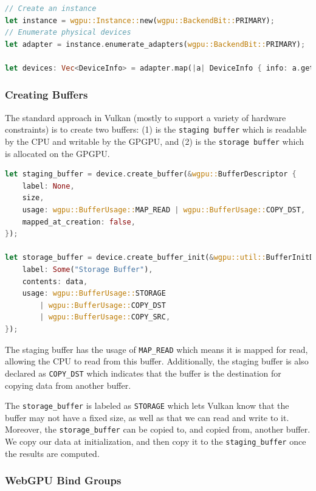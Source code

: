\documentclass{article}
\begin{document}
\begin{lstlisting}[language=Rust, style=boxed]
// Create an instance
let instance = wgpu::Instance::new(wgpu::BackendBit::PRIMARY);
// Enumerate physical devices
let adapter = instance.enumerate_adapters(wgpu::BackendBit::PRIMARY);

let devices: Vec<DeviceInfo> = adapter.map(|a| DeviceInfo { info: a.get_info() }).collect();
\end{lstlisting}

\subsubsection{Creating Buffers}

The standard approach in Vulkan (mostly to support a variety of hardware constraints) is to create two buffers: (1) is the \texttt{staging buffer} which is readable by the CPU and writable by the GPGPU, and (2) is the \texttt{storage buffer} which is allocated on the GPGPU. 

\begin{lstlisting}[language=Rust, style=boxed]
let staging_buffer = device.create_buffer(&wgpu::BufferDescriptor {
    label: None,
    size,
    usage: wgpu::BufferUsage::MAP_READ | wgpu::BufferUsage::COPY_DST,
    mapped_at_creation: false,
});

let storage_buffer = device.create_buffer_init(&wgpu::util::BufferInitDescriptor {
    label: Some("Storage Buffer"),
    contents: data,
    usage: wgpu::BufferUsage::STORAGE
        | wgpu::BufferUsage::COPY_DST
        | wgpu::BufferUsage::COPY_SRC,
});
\end{lstlisting}

The staging buffer has the usage of \texttt{MAP\_READ} which means it is mapped for read, allowing the CPU to read from this buffer. Additionally, the staging buffer is also declared as \texttt{COPY\_DST}  which indicates that the buffer is the destination for copying data from another buffer.

The \texttt{storage\_buffer} is labeled as \texttt{STORAGE} which lets Vulkan know that the buffer may not have a fixed size, as well as that we can read and write to it. Moreover, the \texttt{storage\_buffer} can be copied to, and copied from, another buffer. We copy our data at initialization, and then copy it to the \texttt{staging\_buffer} once the results are computed.

\subsubsection{WebGPU Bind Groups}
\end{document}
